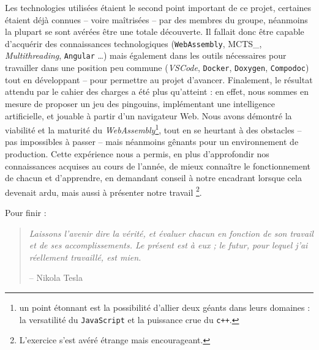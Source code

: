 \documentclass[a4paper,11pt]{article}
\begin{document}
Les technologies utilisées étaient le second point important de ce
projet, certaines étaient déjà connues -- voire maîtrisées -- par des
membres du groupe, néanmoins la plupart se sont avérées être une totale
découverte. Il fallait donc être capable d'acquérir des connaissances
technologiques (\texttt{WebAssembly}, MCTS\_, \emph{Multithreading},
\texttt{Angular} \ldots{}) mais également dans les outils nécessaires
pour travailler dans une position peu commune (\emph{VSCode},
\texttt{Docker}, \texttt{Doxygen}, \texttt{Compodoc}) tout en
développant -- pour permettre au projet d'avancer. Finalement, le
résultat attendu par le cahier des charges a été plus qu'atteint : en
effet, nous sommes en mesure de proposer un jeu des pingouins,
implémentant une intelligence artificielle, et jouable à partir d'un
navigateur Web. Nous avons démontré la viabilité et la maturité du
\emph{WebAssembly}\footnote{un point étonnant est la possibilité
  d'allier deux géants dans leurs domaines : la versatilité du
  \texttt{JavaScript} et la puissance crue du \texttt{c++}.}, tout en se
heurtant à des obstacles -- pas impossibles à passer -- mais néanmoins
gênants pour un environnement de production. Cette expérience nous a
permis, en plus d'approfondir nos connaissances acquises au cours de
l'année, de mieux connaître le fonctionnement de chacun et d'apprendre,
en demandant conseil à notre encadrant lorsque cela devenait ardu, mais
aussi à présenter notre travail \footnote{L'exercice s'est avéré étrange
  mais encourageant.}.

Pour finir :

\begin{quote}
\emph{Laissons l'avenir dire la vérité, et évaluer chacun en fonction de
son travail et de ses accomplissements. Le présent est à eux ; le futur,
pour lequel j'ai réellement travaillé, est mien.}

-- Nikola Tesla
\end{quote}

% 

\end{document}
